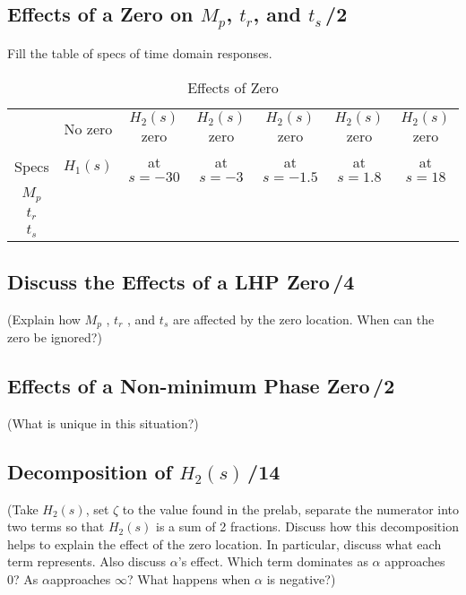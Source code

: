 \documentclass{article}
\newcommand{\score}{\hfill \underline{\hspace{0.65cm}}\,/} %
\begin{document}
\subsection{Effects of a Zero on $M_p$, $t_r$, and $t_s$\score 2}
Fill the table of specs of time domain responses.

\begin{table}[phtb]\footnotesize 
\begin{center}
\caption{Effects of Zero}
\label{tbl:lab2_q2}
\begin{tabular}{c|c|c|c|c|c|c} \hline \hline
\rowcolor{Grey} & No zero & $H_2(s)$ zero &  $H_2(s)$ zero &  $H_2(s)$ zero  &  $H_2(s)$ zero &  $H_2(s)$ zero \\
\rowcolor{Grey} Specs & $H_1(s)$ & at $s = -30$ & at $s = -3$ &  at $s = -1.5$ &   at $s = 1.8$ &   at $s = 18$ \\ \hline
$M_p$ &  &  &  &  &  &  \\ \hline
$t_r$ &  &  &  &  &  &  \\ \hline
$t_s$ &  &  &  &  &  & \\ \hline
\end{tabular}
\end{center}
\end{table}

\subsection{Discuss the Effects of a LHP Zero\score 4}
(Explain how $M_p$ , $t_r$ , and $t_s$ are affected by the zero location. When can the zero be ignored?)

\subsection{Effects of a Non-minimum Phase Zero\score 2}
(What is unique in this situation?)

\subsection{Decomposition of $H_2(s)$\score 14}
(Take $H_2(s)$, set $\zeta$ to the value found in the prelab, separate the numerator into two terms so that $H_2(s)$ is a sum of 2 fractions. Discuss how this decomposition helps to explain the effect of the zero location. In particular, discuss what each term represents. Also discuss $\alpha$'s effect. Which term dominates as $\alpha$ approaches 0? As $\alpha$approaches $\infty$?  What happens when $\alpha$ is negative?)
\end{document}
